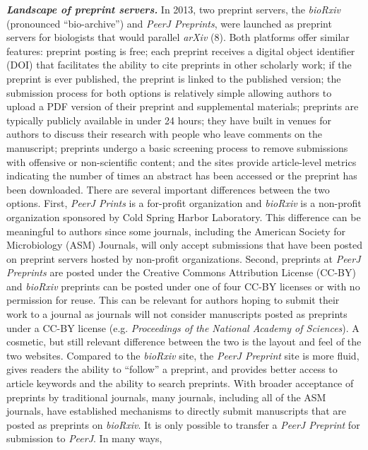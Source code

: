 \documentclass[11pt,]{article}
\begin{document}
\textbf{\emph{Landscape of preprint servers.}} In 2013, two preprint
servers, the \emph{bioRxiv} (pronounced ``bio-archive'') and \emph{PeerJ
Preprints}, were launched as preprint servers for biologists that would
parallel \emph{arXiv} (8). Both platforms offer similar features:
preprint posting is free; each preprint receives a digital object
identifier (DOI) that facilitates the ability to cite preprints in other
scholarly work; if the preprint is ever published, the preprint is
linked to the published version; the submission process for both options
is relatively simple allowing authors to upload a PDF version of their
preprint and supplemental materials; preprints are typically publicly
available in under 24 hours; they have built in venues for authors to
discuss their research with people who leave comments on the manuscript;
preprints undergo a basic screening process to remove submissions with
offensive or non-scientific content; and the sites provide article-level
metrics indicating the number of times an abstract has been accessed or
the preprint has been downloaded. There are several important
differences between the two options. First, \emph{PeerJ Prints} is a
for-profit organization and \emph{bioRxiv} is a non-profit organization
sponsored by Cold Spring Harbor Laboratory. This difference can be
meaningful to authors since some journals, including the American
Society for Microbiology (ASM) Journals, will only accept submissions
that have been posted on preprint servers hosted by non-profit
organizations. Second, preprints at \emph{PeerJ Preprints} are posted
under the Creative Commons Attribution License (CC-BY) and
\emph{bioRxiv} preprints can be posted under one of four CC-BY licenses
or with no permission for reuse. This can be relevant for authors hoping
to submit their work to a journal as journals will not consider
manuscripts posted as preprints under a CC-BY license (e.g.
\emph{Proceedings of the National Academy of Sciences}). A cosmetic, but
still relevant difference between the two is the layout and feel of the
two websites. Compared to the \emph{bioRxiv} site, the \emph{PeerJ
Preprint} site is more fluid, gives readers the ability to ``follow'' a
preprint, and provides better access to article keywords and the ability
to search preprints. With broader acceptance of preprints by traditional
journals, many journals, including all of the ASM journals, have
established mechanisms to directly submit manuscripts that are posted as
preprints on \emph{bioRxiv}. It is only possible to transfer a
\emph{PeerJ Preprint} for submission to \emph{PeerJ}. In many ways,
\end{document}
